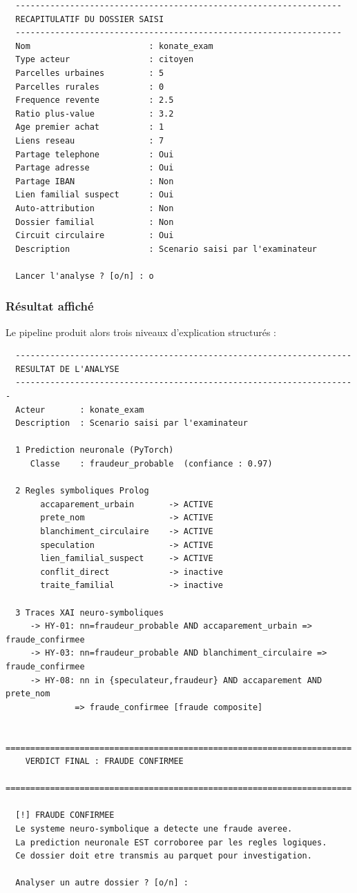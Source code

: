 \documentclass[11pt,a4paper]{report}
\begin{document}
\begin{lstlisting}
  ------------------------------------------------------------------
  RECAPITULATIF DU DOSSIER SAISI
  ------------------------------------------------------------------
  Nom                        : konate_exam
  Type acteur                : citoyen
  Parcelles urbaines         : 5
  Parcelles rurales          : 0
  Frequence revente          : 2.5
  Ratio plus-value           : 3.2
  Age premier achat          : 1
  Liens reseau               : 7
  Partage telephone          : Oui
  Partage adresse            : Oui
  Partage IBAN               : Non
  Lien familial suspect      : Oui
  Auto-attribution           : Non
  Dossier familial           : Non
  Circuit circulaire         : Oui
  Description                : Scenario saisi par l'examinateur

  Lancer l'analyse ? [o/n] : o
\end{lstlisting}

\subsubsection*{Résultat affiché}

Le pipeline produit alors trois niveaux d'explication structurés :

\begin{lstlisting}
  --------------------------------------------------------------------
  RESULTAT DE L'ANALYSE
  ---------------------------------------------------------------------
  Acteur       : konate_exam
  Description  : Scenario saisi par l'examinateur

  1 Prediction neuronale (PyTorch)
     Classe    : fraudeur_probable  (confiance : 0.97)

  2 Regles symboliques Prolog
       accaparement_urbain       -> ACTIVE
       prete_nom                 -> ACTIVE
       blanchiment_circulaire    -> ACTIVE
       speculation               -> ACTIVE
       lien_familial_suspect     -> ACTIVE
       conflit_direct            -> inactive
       traite_familial           -> inactive

  3 Traces XAI neuro-symboliques
     -> HY-01: nn=fraudeur_probable AND accaparement_urbain => fraude_confirmee
     -> HY-03: nn=fraudeur_probable AND blanchiment_circulaire => fraude_confirmee
     -> HY-08: nn in {speculateur,fraudeur} AND accaparement AND prete_nom
              => fraude_confirmee [fraude composite]

  ======================================================================
    VERDICT FINAL : FRAUDE CONFIRMEE
  ======================================================================

  [!] FRAUDE CONFIRMEE
  Le systeme neuro-symbolique a detecte une fraude averee.
  La prediction neuronale EST corroboree par les regles logiques.
  Ce dossier doit etre transmis au parquet pour investigation.

  Analyser un autre dossier ? [o/n] :
\end{lstlisting}
\end{document}
